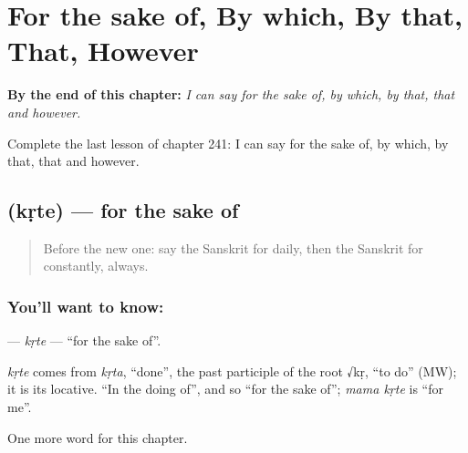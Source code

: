 
\chapter{For the sake of, By which, By that, That, However}
\label{ch:sa-for-the-sake-of-by-which-by-that-that-however}

\begin{chapteropening}
\textbf{By the end of this chapter:} \emph{I can say for the sake of, by which, by that, that and however.}

Complete the last lesson of chapter 241: I can say for the sake of, by which, by that, that and however.
\end{chapteropening}

\section[\texorpdfstring{\sk{कृते} (kṛte)}{कृते (kṛte)}]{ (kṛte) — for the sake of}

\label{lesson:SA-C241-krte}



\begin{quote}
Before the new one: say the Sanskrit for daily, then the Sanskrit for constantly, always.
\end{quote}

\subsection*{You'll want to know: }
\textbf{} — \emph{kṛte} — \textquotedblleft{}for the sake of\textquotedblright{}.

\begin{cousinweb}
\emph{kṛte} comes from \emph{kṛta}, \textquotedblleft{}done\textquotedblright{}, the past participle of the root √kṛ, \textquotedblleft{}to do\textquotedblright{} (MW); it is its locative. \textquotedblleft{}In the doing of\textquotedblright{}, and so \textquotedblleft{}for the sake of\textquotedblright{}; \emph{mama kṛte} is \textquotedblleft{}for me\textquotedblright{}.
\end{cousinweb}

\begin{grammarlens}[title={What you've built}]
One more word for this chapter.
\end{grammarlens}

